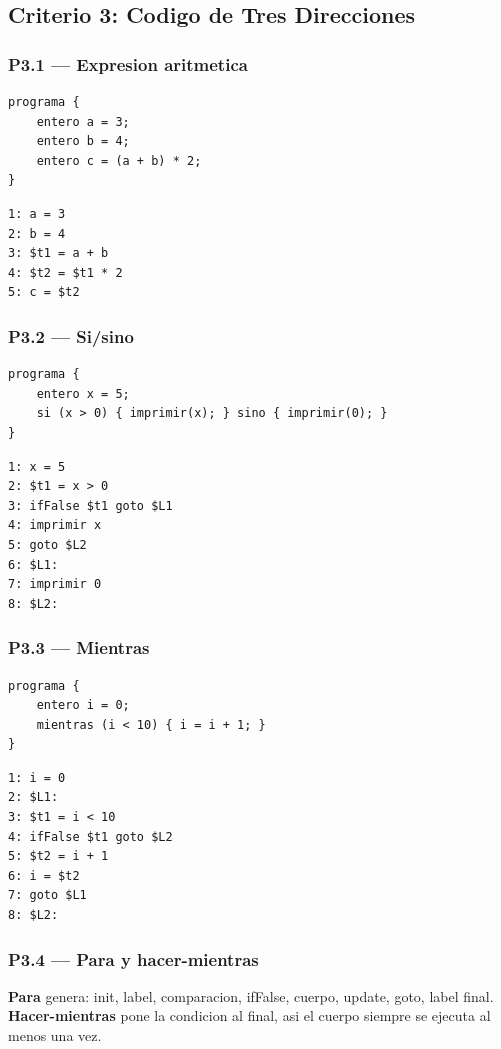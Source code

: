 \documentclass[11pt,a4paper]{article}
\begin{document}
\subsection{Criterio 3: Codigo de Tres Direcciones}

\subsubsection{P3.1 --- Expresion aritmetica}
\begin{lstlisting}[style=ml]
programa {
    entero a = 3;
    entero b = 4;
    entero c = (a + b) * 2;
}
\end{lstlisting}
\begin{lstlisting}[style=tac]
1: a = 3
2: b = 4
3: $t1 = a + b
4: $t2 = $t1 * 2
5: c = $t2
\end{lstlisting}

\subsubsection{P3.2 --- Si/sino}
\begin{lstlisting}[style=ml]
programa {
    entero x = 5;
    si (x > 0) { imprimir(x); } sino { imprimir(0); }
}
\end{lstlisting}
\begin{lstlisting}[style=tac]
1: x = 5
2: $t1 = x > 0
3: ifFalse $t1 goto $L1
4: imprimir x
5: goto $L2
6: $L1:
7: imprimir 0
8: $L2:
\end{lstlisting}

\subsubsection{P3.3 --- Mientras}
\begin{lstlisting}[style=ml]
programa {
    entero i = 0;
    mientras (i < 10) { i = i + 1; }
}
\end{lstlisting}
\begin{lstlisting}[style=tac]
1: i = 0
2: $L1:
3: $t1 = i < 10
4: ifFalse $t1 goto $L2
5: $t2 = i + 1
6: i = $t2
7: goto $L1
8: $L2:
\end{lstlisting}

\subsubsection{P3.4 --- Para y hacer-mientras}
\textbf{Para} genera: init, label, comparacion, ifFalse, cuerpo, update,
goto, label final. \\
\textbf{Hacer-mientras} pone la condicion al final, asi el cuerpo
siempre se ejecuta al menos una vez.
\end{document}
